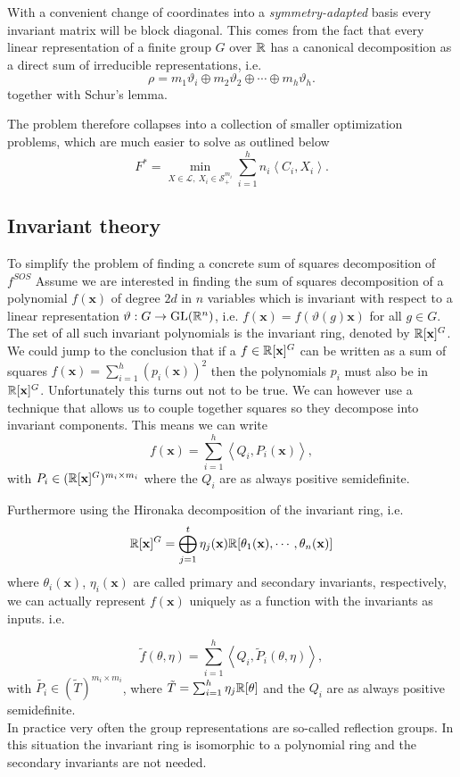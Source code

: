 \documentclass[]{article}
\begin{document}
With a convenient change of coordinates into a \textit{symmetry-adapted} basis every invariant matrix will be block diagonal. This comes from the fact that every linear representation of a finite group $G$ over $\mathbb R$ has a canonical decomposition as a direct sum of irreducible representations, i.e.
\[\rho = m_1\vartheta_i\oplus m_2\vartheta_2 \oplus \cdots \oplus m_h\vartheta_h.\]
together with Schur's lemma.

The problem therefore collapses into a collection of smaller 
optimization problems, which are much easier to solve as outlined below 
\[F^\ast = \min_{X\in\mathcal{L},~X_i \in \mathcal{S}_+^{m_i} }\sum_{i=1}^{h} n_i\left<C_i,X_i\right>.\]

\subsection*{Invariant theory}
To simplify the problem of finding a concrete sum of squares decomposition of $f^{SOS}$
Assume we are interested in finding the sum of squares decomposition of a polynomial $f(\textbf{x})$ of degree $2d$ in $n$
variables which is invariant with respect to a linear representation $\vartheta:G\rightarrow \mathrm{GL}(\mathbb R^n)$, i.e. $f(\textbf{x}) = f(\vartheta(g)\textbf{x})$ for all $g\in G$.
The set of all such invariant polynomials is the invariant ring, denoted by $\mathbb R[\textbf{x}]^G$. We could jump to the conclusion that if a $f\in \mathbb R[\textbf{x}]^G$ can be written as a 
sum of squares $f(\textbf{x}) =\sum_{i=1}^{h}(p_i(\textbf{x}))^2$ then the polynomials $p_i$ must also be in $\mathbb R[\mathbf{x}]^G$. Unfortunately this turns out not to be true. We can however
use a technique that allows us to couple together squares so they decompose into invariant components. This means we can write 
\[f(\textbf{x}) = \sum_{i=1}^{h}\left<Q_i,P_i(\mathbf{x})\right>,\]
with $P_i\in (\mathbb R[\mathbf{x}]^G)^{m_i\times m_i}$
where the $Q_i$ are as always positive semidefinite.


Furthermore using the Hironaka decomposition of the invariant ring, i.e.
\[\mathbb R[\mathbf{x}]^G = \bigoplus_{j=1}^{t}\eta_j(\textbf{x})\mathbb R[\theta_1(\textbf{x}), \cdots, \theta_n(\mathbf{x})]\] 
where $\theta_i(\mathbf{x})$, $\eta_i(\mathbf{x})$ are called primary and secondary invariants, respectively, 
we can actually represent $f(\mathbf{x})$ uniquely as a function with the invariants as inputs. i.e.

\[\tilde{f}(\theta,\eta) = \sum_{i=1}^{h}\left<Q_i,\tilde{P}_i(\theta,\eta)\right>,\] 
with $\tilde{P_i} \in (\tilde{T})^{m_i\times m_i}$, where $\tilde{T} = \sum_{i=1}^{h}\eta_j\mathbb R[\theta]$ and the $Q_i$ are as always positive semidefinite.\\
In practice very often the group representations are so-called reflection groups. In this situation the invariant ring is 
isomorphic to a polynomial ring and the secondary invariants are not needed. %
\end{document}
